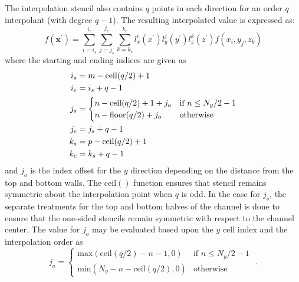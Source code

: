 \documentclass[11pt]{article}
\begin{document}
The interpolation stencil also contains $q$ points in each direction for an order $q$
interpolant (with degree $q-1$). The resulting interpolated value is expressed as:
\begin{equation}\label{eq:interp_poly}
  f(\bm{x}^\prime) = \sum_{i=i_s}^{i_e}\sum_{j=j_s}^{j_e}\sum_{k=k_s}^{k_e}  l_x^{i}(x^\prime) l_y^{j}(y^\prime) l_z^{k}(z^\prime)f(x_{i}, y_{j}, z_{k})
\end{equation}
where the starting and ending indices are given as
\begin{align}
i_s &= m - \text{ceil}(q/2) + 1\notag\\
i_e &= i_s + q - 1 \notag\\
j_s &= 
\begin{cases} 
  n - \text{ceil}(q/2) + 1 + j_o &\mbox{if } n \leq N_y / 2 - 1 \\
  n - \text{floor}(q/2) + j_o &\mbox{otherwise} 
\end{cases} \\
j_e &= j_s + q - 1 \notag\\
k_s &= p - \text{ceil}(q/2) + 1 \notag\\
k_e &= k_s + q - 1 \notag
\end{align}
and $j_o$ is the index offset for the $y$ direction depending on the distance from the top and bottom walls. The $\text{ceil}()$ function ensures that stencil remains symmetric about the interpolation point when $q$ is odd. In the case for $j_s$, the separate treatments for the top and bottom halves of the channel is done to ensure that the one-sided stencils remain symmetric with respect to the channel center. The value for $j_o$ may be evaluated based upon the $y$ cell index and the interpolation order as 
\begin{equation}
  j_o = 
  \begin{cases} 
    \text{max}(\text{ceil}(q/2)-n-1,0) &\mbox{if } n \leq N_y/2-1 \\
    \text{min}(N_y - n - \text{ceil}(q/2),0) & \mbox{otherwise}  
  \end{cases}	
  \mbox{ .}
\end{equation}
\end{document}
